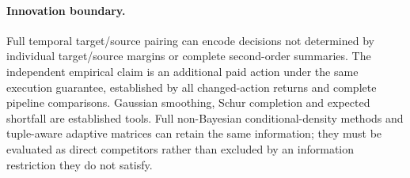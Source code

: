 \paragraph{Innovation boundary.}
Full temporal target/source pairing can encode decisions not determined by
individual target/source margins or complete second-order summaries.
The independent empirical claim is an additional paid action under the same
execution guarantee, established by all changed-action returns and complete
pipeline comparisons. Gaussian smoothing, Schur completion and expected
shortfall are established tools. Full non-Bayesian conditional-density
methods and tuple-aware adaptive matrices can retain the same information;
they must be evaluated as direct competitors rather than excluded by an
information restriction they do not satisfy.
